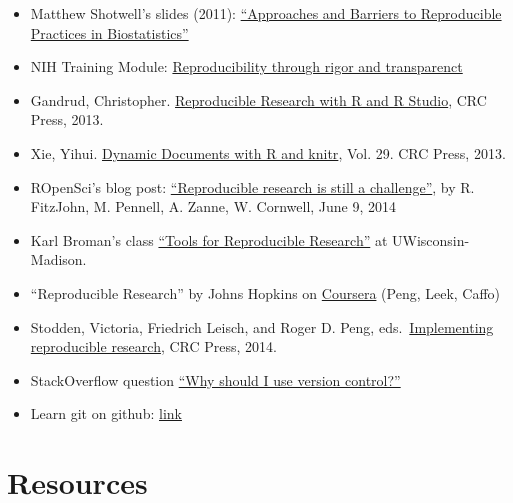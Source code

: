 \documentclass[
]{book}
\providecommand{\tightlist}{%
  \setlength{\itemsep}{0pt}\setlength{\parskip}{0pt}}
\begin{document}
\begin{itemize}
\tightlist
\item
  Matthew Shotwell's slides (2011): \href{https://rstudio-pubs-static.s3.amazonaws.com/177032_7be0bffdc2274d679c03b7228ac7b91f.html}{``Approaches and Barriers to Reproducible Practices in Biostatistics''}
\item
  NIH Training Module: \href{https://grants.nih.gov/reproducibility/module_1/presentation.html}{Reproducibility through rigor and transparenct}
\item
  Gandrud, Christopher. \href{https://englianhu.files.wordpress.com/2016/01/reproducible-research-with-r-and-studio-2nd-edition.pdf}{Reproducible Research with R and R Studio}, CRC Press, 2013.
\item
  Xie, Yihui. \href{http://static.latexstudio.net/wp-content/uploads/2014/03/DDR-Yihui-Xie-Chap1-3.pdf}{Dynamic Documents with R and knitr}, Vol. 29. CRC Press, 2013.
\item
  ROpenSci's blog post: \href{https://ropensci.org/blog/2014/06/09/reproducibility/}{``Reproducible research is still a challenge''}, by R. FitzJohn, M. Pennell, A. Zanne, W. Cornwell, June 9, 2014
\item
  Karl Broman's class \href{http://kbroman.org/Tools4RR/}{``Tools for Reproducible Research''} at UWisconsin-Madison.
\item
  ``Reproducible Research'' by Johns Hopkins on \href{https://www.coursera.org/learn/reproducible-research}{Coursera} (Peng, Leek, Caffo)
\item
  Stodden, Victoria, Friedrich Leisch, and Roger D. Peng, eds.~\href{https://www.jstatsoft.org/article/view/v061b02/v61b02.pdf}{Implementing reproducible research}, CRC Press, 2014.
\item
  StackOverflow question \href{https://stackoverflow.com/questions/1408450/why-should-i-use-version-control\#:~:text=Version\%20control\%20gives\%20you\%20the,using\%20tools.}{``Why should I use version control?''}
\item
  Learn git on github: \href{https://try.github.io/levels/1/challenges/1}{link}
\end{itemize}

\hypertarget{resources-1}{%
\chapter{Resources}\label{resources-1}}
\end{document}
